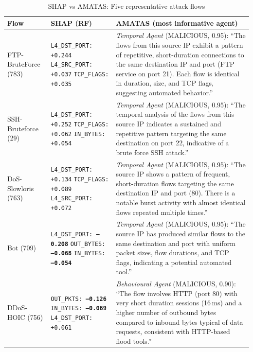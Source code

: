 \documentclass[../main.tex]{subfiles}
\begin{document}
\begin{table}[H]
\centering
\caption{SHAP vs AMATAS: Five representative attack flows}
\label{tab:shap-vs-amatas}
\scriptsize
\begin{tabularx}{\textwidth}{@{}l l X@{}}
\toprule
\textbf{Flow} & \textbf{SHAP (RF)} & \textbf{AMATAS (most informative agent)} \\
\midrule
FTP-Brute\-Force (783) &
\texttt{L4\_DST\_PORT: +0.244} \newline \texttt{L4\_SRC\_PORT: +0.037} \newline \texttt{TCP\_FLAGS: +0.035} &
\textit{Temporal Agent} (MALICIOUS, 0.95): ``The flows from this source IP exhibit a pattern of repetitive, short-duration connections to the same destination IP and port (FTP service on port 21). Each flow is identical in duration, size, and TCP flags, suggesting automated behavior.'' \\
\addlinespace
SSH-Brute\-force (29) &
\texttt{L4\_DST\_PORT: +0.252} \newline \texttt{TCP\_FLAGS: +0.062} \newline \texttt{IN\_BYTES: +0.054} &
\textit{Temporal Agent} (MALICIOUS, 0.95): ``The temporal analysis of the flows from this source IP indicates a sustained and repetitive pattern targeting the same destination on port 22, indicative of a brute force SSH attack.'' \\
\addlinespace
DoS-Slow\-loris (763) &
\texttt{L4\_DST\_PORT: +0.134} \newline \texttt{TCP\_FLAGS: +0.089} \newline \texttt{L4\_SRC\_PORT: +0.072} &
\textit{Temporal Agent} (MALICIOUS, 0.95): ``The source IP shows a pattern of frequent, short-duration flows targeting the same destination IP and port (80). There is a notable burst activity with almost identical flows repeated multiple times.'' \\
\addlinespace
Bot (709) &
\texttt{L4\_DST\_PORT: \textbf{--0.208}} \newline \texttt{OUT\_BYTES: \textbf{--0.068}} \newline \texttt{IN\_BYTES: \textbf{--0.054}} &
\textit{Temporal Agent} (MALICIOUS, 0.95): ``The source IP has produced similar flows to the same destination and port with uniform packet sizes, flow durations, and TCP flags, indicating a potential automated tool.'' \\
\addlinespace
DDoS-HOIC (756) &
\texttt{OUT\_PKTS: \textbf{--0.126}} \newline \texttt{IN\_BYTES: \textbf{--0.069}} \newline \texttt{L4\_DST\_PORT: +0.061} &
\textit{Behavioural Agent} (MALICIOUS, 0.90): ``The flow involves HTTP (port 80) with very short duration sessions (16\,ms) and a higher number of outbound bytes compared to inbound bytes typical of data requests, consistent with HTTP-based flood tools.'' \\
\bottomrule
\end{tabularx}
\end{table}
\end{document}
